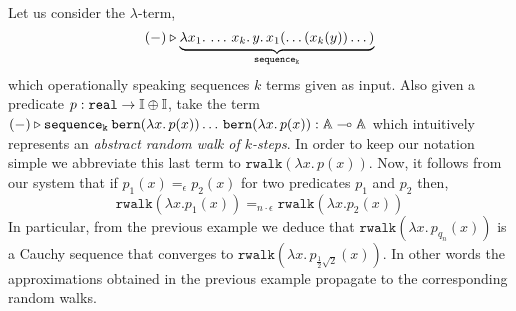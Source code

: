 \documentclass[a4paper,UKenglish,cleveref, autoref, thm-restate]{lipics-v2021}
\begin{document}
\begin{example} 
        Let us consider the $\lambda$-term,
        \[
                (-) \triangleright \underbrace{\lambda x_1. \, \dots \, x_k. \, y. \,
                x_1 (\dots (x_k(y)) \dots)}_{\mathtt{sequence_k}}
        \]
        which operationally speaking sequences $k$ terms given as input. Also
        given a predicate $p : \mathtt{real} \to \mathbb{I} \oplus \mathbb{I}$, take
        the term $(-) \triangleright \mathtt{sequence_k} \>
        \mathtt{bern}(\lambda x. \, p(x)) \dots \, \mathtt{bern}(\lambda x. \,
        p(x)) : \mathbb{A} \multimap \mathbb{A}$ which intuitively represents an
        \emph{abstract random walk of $k$-steps}. In order to keep our notation
        simple we abbreviate this last term to $\mathtt{rwalk}(\lambda x. \,
        p(x))$. Now, it follows from our system that if $p_1(x) =_\epsilon
        p_2(x)$ for two predicates $p_1$ and $p_2$ then,
        \[
                \mathtt{rwalk}(\lambda x. p_1(x)) =_{n \cdot \epsilon}
                \mathtt{rwalk}(\lambda x. p_2(x)) 
        \]
        In particular, from the previous example we deduce that $\mathtt{rwalk}
        (\lambda x. \, p_{q_n} (x))$ is a Cauchy sequence that converges to
        $\mathtt{rwalk}(\lambda x.  \, p_{\frac{1}{2} \sqrt{2}} (x) )$. In
        other words the approximations obtained in the previous example
        propagate to the corresponding random walks.


\end{example}
\end{document}

